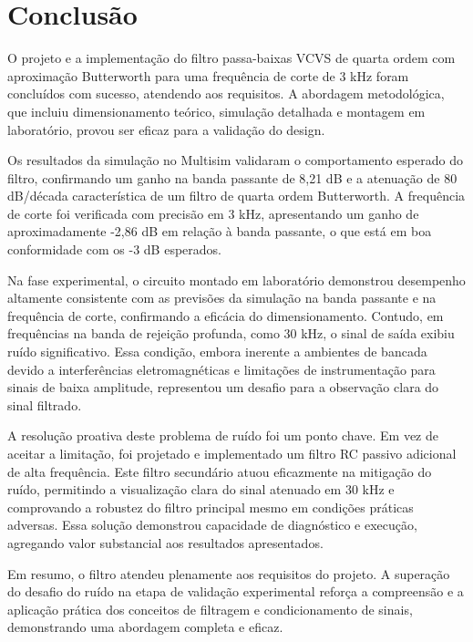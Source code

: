 \section{Conclusão}

O projeto e a implementação do filtro passa-baixas VCVS de quarta ordem com aproximação Butterworth para uma frequência de corte de 3 kHz foram concluídos com sucesso, atendendo aos requisitos. A abordagem metodológica, que incluiu dimensionamento teórico, simulação detalhada e montagem em laboratório, provou ser eficaz para a validação do design.

Os resultados da simulação no Multisim\textregistered{} validaram o comportamento esperado do filtro, confirmando um ganho na banda passante de 8,21 dB e a atenuação de 80 dB/década característica de um filtro de quarta ordem Butterworth. A frequência de corte foi verificada com precisão em 3 kHz, apresentando um ganho de aproximadamente -2,86 dB em relação à banda passante, o que está em boa conformidade com os -3 dB esperados.

Na fase experimental, o circuito montado em laboratório demonstrou desempenho altamente consistente com as previsões da simulação na banda passante e na frequência de corte, confirmando a eficácia do dimensionamento. Contudo, em frequências na banda de rejeição profunda, como 30 kHz, o sinal de saída exibiu ruído significativo. Essa condição, embora inerente a ambientes de bancada devido a interferências eletromagnéticas e limitações de instrumentação para sinais de baixa amplitude, representou um desafio para a observação clara do sinal filtrado.

A resolução proativa deste problema de ruído foi um ponto chave. Em vez de aceitar a limitação, foi projetado e implementado um filtro RC passivo adicional de alta frequência. Este filtro secundário atuou eficazmente na mitigação do ruído, permitindo a visualização clara do sinal atenuado em 30 kHz e comprovando a robustez do filtro principal mesmo em condições práticas adversas. Essa solução demonstrou capacidade de diagnóstico e execução, agregando valor substancial aos resultados apresentados.

Em resumo, o filtro atendeu plenamente aos requisitos do projeto. A superação do desafio do ruído na etapa de validação experimental reforça a compreensão e a aplicação prática dos conceitos de filtragem e condicionamento de sinais, demonstrando uma abordagem completa e eficaz.

\nocite{*}
